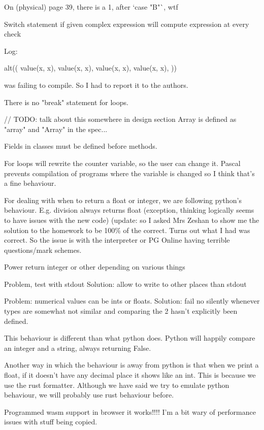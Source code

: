 \documentclass{article}
\begin{document}
On (physical) page 39, there is a 1, after `case "B"`, wtf

Switch statement if given complex expression will compute expression at every
check

Log:


alt((
	value(x, x),
	value(x, x),
	value(x, x),
	value(x, x),
))

was failing to compile. So I had to report it to the authors.

There is no "break" statement for loops.

// TODO: talk about this somewhere in design section
Array is defined as "array" and "Array" in the spec...

Fields in classes must be defined before methods.

For loops will rewrite the counter variable, so the user can change it.
Pascal prevents compilation of programs where the variable is changed so I
think that's a fine behaviour.

For dealing with when to return a float or integer, we are following python's
behaviour. E.g. division always returns float (exception, thinking logically
seems to have issues with the new code) (update: so I asked Mrs Zeshan to show
me the solution to the homework to be 100\% of the correct. Turns out what I
had was correct. So the issue is with the interpreter or PG Online having
terrible questions/mark schemes.

Power return integer or other depending on various things

Problem, test with stdout
Solution: allow to write to other places than stdout

Problem: numerical values can be ints or floats.
Solution: fail no silently whenever types are somewhat not similar and
comparing the 2 hasn't explicitly been defined.

This behaviour is different than what python does. Python will happily compare
an integer and a string, always returning False.

Another way in which the behaviour is away from python is that when we print a
float, if it doesn't have any decimal place it shows like an int. This is
because we use the rust formatter. Although we have said we try to emulate
python behaviour, we will probably use rust behaviour before.

Programmed wasm support in browser it works!!!! I'm a bit wary of performance
issues with stuff being copied.
\end{document}
